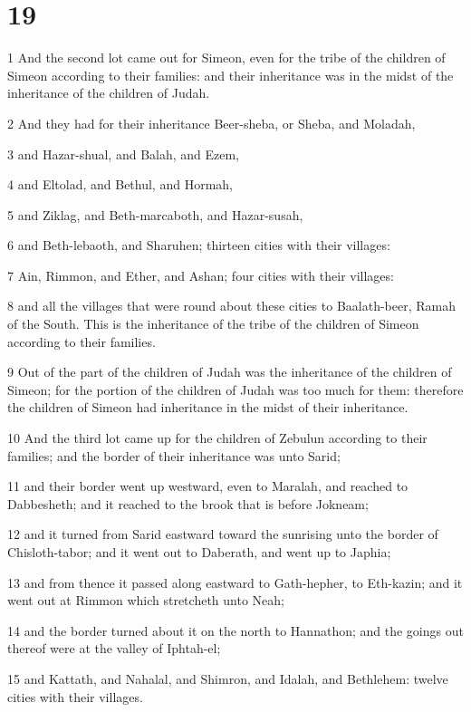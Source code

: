 \chapter{19}

\par 1 And the second lot came out for Simeon, even for the tribe of the children of Simeon according to their families: and their inheritance was in the midst of the inheritance of the children of Judah.
\par 2 And they had for their inheritance Beer-sheba, or Sheba, and Moladah,
\par 3 and Hazar-shual, and Balah, and Ezem,
\par 4 and Eltolad, and Bethul, and Hormah,
\par 5 and Ziklag, and Beth-marcaboth, and Hazar-susah,
\par 6 and Beth-lebaoth, and Sharuhen; thirteen cities with their villages:
\par 7 Ain, Rimmon, and Ether, and Ashan; four cities with their villages:
\par 8 and all the villages that were round about these cities to Baalath-beer, Ramah of the South. This is the inheritance of the tribe of the children of Simeon according to their families.
\par 9 Out of the part of the children of Judah was the inheritance of the children of Simeon; for the portion of the children of Judah was too much for them: therefore the children of Simeon had inheritance in the midst of their inheritance.
\par 10 And the third lot came up for the children of Zebulun according to their families; and the border of their inheritance was unto Sarid;
\par 11 and their border went up westward, even to Maralah, and reached to Dabbesheth; and it reached to the brook that is before Jokneam;
\par 12 and it turned from Sarid eastward toward the sunrising unto the border of Chisloth-tabor; and it went out to Daberath, and went up to Japhia;
\par 13 and from thence it passed along eastward to Gath-hepher, to Eth-kazin; and it went out at Rimmon which stretcheth unto Neah;
\par 14 and the border turned about it on the north to Hannathon; and the goings out thereof were at the valley of Iphtah-el;
\par 15 and Kattath, and Nahalal, and Shimron, and Idalah, and Bethlehem: twelve cities with their villages.
